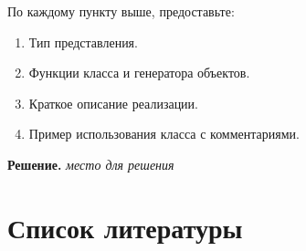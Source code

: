 \documentclass[dvipsnames]{article}
\begin{document}
По каждому пункту выше, предоставьте:
\begin{enumerate}
  \item[\textbf{(i)}] Тип представления.
  \item[\textbf{(ii)}] Функции класса и генератора объектов.
  \item[\textbf{(iii)}] Краткое описание реализации.
  \item[\textbf{(iv)}] Пример использования класса с комментариями.
\end{enumerate}

  \color{blue}
  \textbf{Решение.}
  \emph{место для решения}
  \color{black}

\section*{Список литературы}
\printbibliography[heading=none]
\end{document}
